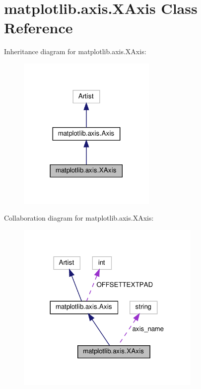 \hypertarget{classmatplotlib_1_1axis_1_1XAxis}{}\section{matplotlib.\+axis.\+X\+Axis Class Reference}
\label{classmatplotlib_1_1axis_1_1XAxis}


Inheritance diagram for matplotlib.\+axis.\+X\+Axis\+:
\nopagebreak
\begin{figure}[H]
\begin{center}
\leavevmode
\includegraphics[width=189pt]{classmatplotlib_1_1axis_1_1XAxis__inherit__graph}
\end{center}
\end{figure}


Collaboration diagram for matplotlib.\+axis.\+X\+Axis\+:
\nopagebreak
\begin{figure}[H]
\begin{center}
\leavevmode
\includegraphics[width=252pt]{classmatplotlib_1_1axis_1_1XAxis__coll__graph}
\end{center}
\end{figure}
